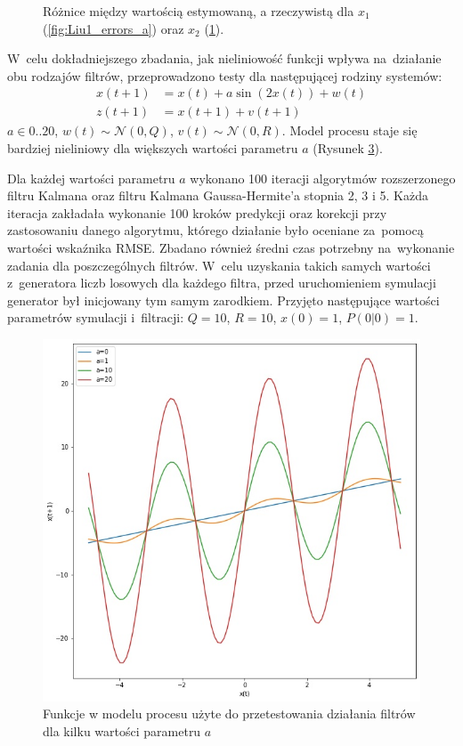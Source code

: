 \begin{figure}
\begin{subfigure}[b]{0.4\linewidth}
		\caption{}
		\label{fig:Liu1_errors_b}
	\end{subfigure}
	\caption{Różnice między wartością estymowaną, a rzeczywistą dla $x_1$(\ref{fig:Liu1_errors_a}) oraz $x_2$ (\ref{fig:Liu1_errors_b}).}
	\label{fig:Liu1_errors}
\end{figure}


\par


W~celu dokładniejszego zbadania, jak nieliniowość funkcji wpływa na~działanie obu rodzajów filtrów, przeprowadzono testy dla następującej rodziny systemów:
\begin{align}\label{eq:rmseTestModel}
x(t+1) &= x(t) + a\sin(2x(t)) + w(t) \nonumber \\
z(t+1) &= x(t+1) + v(t+1)
\end{align}
$a\in{0..20}$, $w(t) \sim \mathcal{N}(0, Q)$, $v(t) \sim \mathcal{N}(0, R)$. Model procesu staje się bardziej nieliniowy dla większych wartości parametru $a$ (Rysunek \ref{fig:rmse_test_functions}). \par
Dla każdej wartości parametru $a$ wykonano 100 iteracji algorytmów rozszerzonego filtru Kalmana oraz filtru Kalmana Gaussa-Hermite'a stopnia 2, 3 i 5. Każda iteracja zakładała wykonanie 100 kroków predykcji oraz korekcji przy zastosowaniu danego algorytmu, którego działanie było oceniane za~pomocą wartości wskaźnika RMSE. Zbadano również średni czas potrzebny na~wykonanie zadania dla poszczególnych filtrów. W~celu uzyskania takich samych wartości z~generatora liczb losowych dla każdego filtra, przed uruchomieniem symulacji generator był inicjowany tym samym zarodkiem. Przyjęto następujące wartości parametrów symulacji i~filtracji: $Q=10$, $R=10$, $x(0)=1$, $P(0|0)=1$. \par
\begin{figure}[h!]
	\centering
	\includegraphics[width=0.5\linewidth]{rmse_test_functions.jpg}
	\caption{Funkcje w modelu procesu użyte do przetestowania działania filtrów dla kilku wartości parametru $a$}
	\label{fig:rmse_test_functions}
\end{figure}
